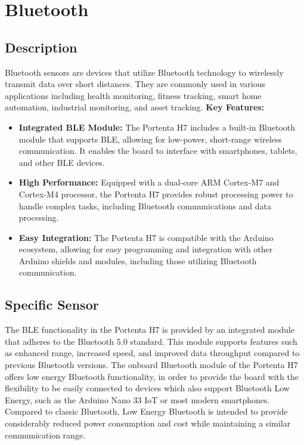 \chapter{Bluetooth}

\section{Description}

Bluetooth sensors are devices that utilize Bluetooth technology to wirelessly transmit data over short distances. They are commonly used in various applications including health monitoring, fitness tracking, smart home automation, industrial monitoring, and asset tracking. \cite{PortentaH7BLE:2024}
\newline
\textbf{Key Features:} \newline
\begin{itemize}

\item \textbf{Integrated BLE Module:} The Portenta H7 includes a built-in Bluetooth module that supports BLE, allowing for low-power, short-range wireless communication. It enables the board to interface with smartphones, tablets, and other BLE devices. 

\item \textbf{High Performance:} Equipped with a dual-core ARM Cortex-M7 and Cortex-M4 processor, the Portenta H7 provides robust processing power to handle complex tasks, including Bluetooth communications and data processing. 

\item \textbf{Easy Integration:} The Portenta H7 is compatible with the Arduino ecosystem, allowing for easy programming and integration with other Arduino shields and modules, including those utilizing Bluetooth communication. \cite{PortentaH7BLE:2024}

\end{itemize}

\section{Specific Sensor}
The BLE functionality in the Portenta H7 is provided by an integrated module that adheres to the Bluetooth 5.0 standard. This module supports features such as enhanced range, increased speed, and improved data throughput compared to previous Bluetooth versions.
\newline
The onboard Bluetooth module of the Portenta H7 offers low energy Bluetooth functionality, in order to provide the board with the flexibility to be easily connected to devices which also support Bluetooth Low Energy, such as the Arduino Nano 33 IoT or most modern smartphones. Compared to classic Bluetooth, Low Energy Bluetooth is intended to provide considerably reduced power consumption and cost while maintaining a similar communication range. \cite{PortentaH7BLE:2024}


